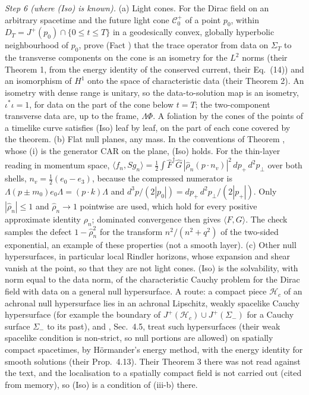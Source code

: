 \emph{Step 6 (where (Iso) is known).} (a) Light cones. For the Dirac field on an arbitrary spacetime and the future light cone $\mathcal{C}^{+}_{0}$ of a point $p_{0}$, within $D_{T} = J^{+}(p_{0})\cap\{0 \le t \le T\}$ in a geodesically convex, globally hyperbolic neighbourhood of $p_{0}$, \cite{HafnerNicolas2011} prove (Fact ) that the trace operator from data on $\Sigma_{T}$ to the transverse components on the cone is an isometry for the $L^{2}$ norms (their Theorem 1, from the energy identity of the conserved current, their Eq.~(14)) and an isomorphism of $H^{1}$ onto the space of characteristic data (their Theorem 2). An isometry with dense range is unitary, so the data-to-solution map is an isometry, $\iota^{*}\iota = 1$, for data on the part of the cone below $t = T$; the two-component transverse data are, up to the frame, $\Lambda\Phi$. A foliation by the cones of the points of a timelike curve satisfies (Iso) leaf by leaf, on the part of each cone covered by the theorem. (b) Flat null planes, any mass. In the conventions of Theorem , whose (i) is the generator CAR on the plane, (Iso) holds. For the thin-layer reading in momentum space, $\langle f_{n}, Sg_{n}\rangle = \tfrac12\int\hat F^{\dagger}\hat G\,|\hat\rho_{n}(p\cdot n_{v})|^{2}\,dp_{+}\,d^{2}p_{\perp}$ over both shells, $n_{v} = \tfrac12(e_{0} - e_{3})$, because the compressed numerator is $\Lambda(p \pm m_{0})e_{0}\Lambda = (p\cdot k)\Lambda$ and $d^{3}p/(2|p_{0}|) = dp_{+}\,d^{2}p_{\perp}/(2|p_{+}|)$. Only $|\hat\rho_{n}| \le 1$ and $\hat\rho_{n} \to 1$ pointwise are used, which hold for every positive approximate identity $\rho_{n}$; dominated convergence then gives $\langle F, G\rangle$. The check samples the defect $1 - \hat\rho_{n}^{2}$ for the transform $n^{2}/(n^{2} + q^{2})$ of the two-sided exponential, an example of these properties (not a smooth layer). (c) Other null hypersurfaces, in particular local Rindler horizons, whose expansion and shear vanish at the point, so that they are not light cones. (Iso) is the solvability, with norm equal to the data norm, of the characteristic Cauchy problem for the Dirac field with data on a general null hypersurface. A route: a compact piece $\mathcal{H}_{c}$ of an achronal null hypersurface lies in an achronal Lipschitz, weakly spacelike Cauchy hypersurface (for example the boundary of $J^{+}(\mathcal{H}_{c})\cup J^{+}(\Sigma_{-})$ for a Cauchy surface $\Sigma_{-}$ to its past), and \cite{HafnerNicolas2011}, Sec.~4.5, treat such hypersurfaces (their weak spacelike condition is non-strict, so null portions are allowed) on spatially compact spacetimes, by Hörmander's energy method, with the energy identity for smooth solutions (their Prop.~4.13). Their Theorem 3 there was not read against the text, and the localisation to a spatially compact field is not carried out (cited from memory), so (Iso) is a condition of (iii-b) there.

